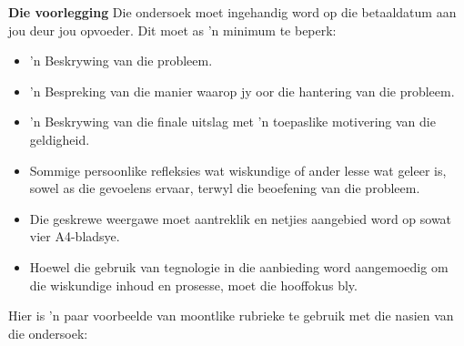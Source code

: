 \textbf{Die voorlegging}
Die ondersoek moet ingehandig word op die betaaldatum aan jou deur jou opvoeder. Dit moet as 'n minimum te beperk:
\begin{itemize}[noitemsep]
\item
  'n Beskrywing van die probleem.
\item
  'n Bespreking van die manier waarop jy oor die hantering van die probleem.
\item
  'n Beskrywing van die finale uitslag met 'n toepaslike motivering van die geldigheid.
\item
  Sommige persoonlike refleksies wat wiskundige of ander lesse wat geleer is, sowel as die gevoelens ervaar, terwyl die beoefening van die probleem.
\item
  Die geskrewe weergawe moet aantreklik en netjies aangebied word op sowat vier A4-bladsye.
\item
  Hoewel die gebruik van tegnologie in die aanbieding word aangemoedig om die wiskundige inhoud en prosesse, moet die hooffokus bly.
\end{itemize}	
Hier is 'n paar voorbeelde van moontlike rubrieke te gebruik met die nasien van die ondersoek:

